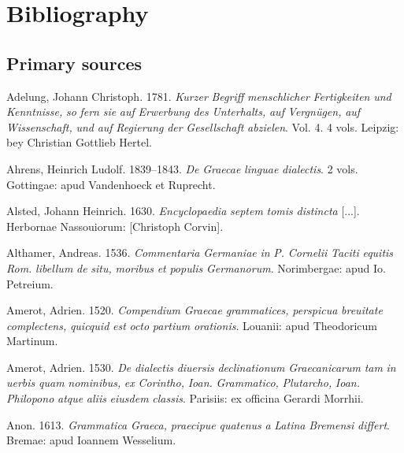 \section{Bibliography}
\hypertarget{Toc19704870}{}\subsection{Primary sources}
\hypertarget{Toc19704871}{}
Adelung, Johann Christoph. 1781. \textit{Kurzer} \textit{Begriff} \textit{menschlicher} \textit{Fertigkeiten} \textit{und} \textit{Kenntnisse,} \textit{so} \textit{fern} \textit{sie} \textit{auf} \textit{Erwerbung} \textit{des} \textit{Unterhalts,} \textit{auf} \textit{Vergnügen,} \textit{auf} \textit{Wissenschaft,} \textit{und} \textit{auf} \textit{Regierung} \textit{der} \textit{Gesellschaft} \textit{abzielen}. Vol. 4. 4 vols. Leipzig: bey Christian Gottlieb Hertel.

Ahrens, Heinrich Ludolf. 1839–1843. \textit{De} \textit{Graecae} \textit{linguae} \textit{dialectis}. 2 vols. Gottingae: apud Vandenhoeck et Ruprecht.

Alsted, Johann Heinrich. 1630. \textit{Encyclopaedia} \textit{septem} \textit{tomis} \textit{distincta} [...]. Herbornae Nassouiorum: [Christoph Corvin].

Althamer, Andreas. 1536. \textit{Commentaria} \textit{Germaniae} \textit{in} \textit{P.} \textit{Cornelii} \textit{Taciti} \textit{equitis} \textit{Rom.} \textit{libellum} \textit{de} \textit{situ,} \textit{moribus} \textit{et} \textit{populis} \textit{Germanorum}. Norimbergae: apud Io. Petreium.

Amerot, Adrien. 1520. \textit{Compendium} \textit{Graecae} \textit{grammatices,} \textit{perspicua} \textit{breuitate} \textit{complectens,} \textit{quicquid} \textit{est} \textit{octo} \textit{partium} \textit{orationis}. Louanii: apud Theodoricum Martinum.

Amerot, Adrien. 1530. \textit{De} \textit{dialectis} \textit{diuersis} \textit{declinationum} \textit{Graecanicarum} \textit{tam} \textit{in} \textit{uerbis} \textit{quam} \textit{nominibus,} \textit{ex} \textit{Corintho,} \textit{Ioan.} \textit{Grammatico,} \textit{Plutarcho,} \textit{Ioan.} \textit{Philopono} \textit{atque} \textit{aliis} \textit{eiusdem} \textit{classis}. Parisiis: ex officina Gerardi Morrhii.

Anon. 1613. \textit{Grammatica} \textit{Graeca,} \textit{praecipue} \textit{quatenus} \textit{a} \textit{Latina} \textit{Bremensi} \textit{differt}. Bremae: apud Ioannem Wesselium.


